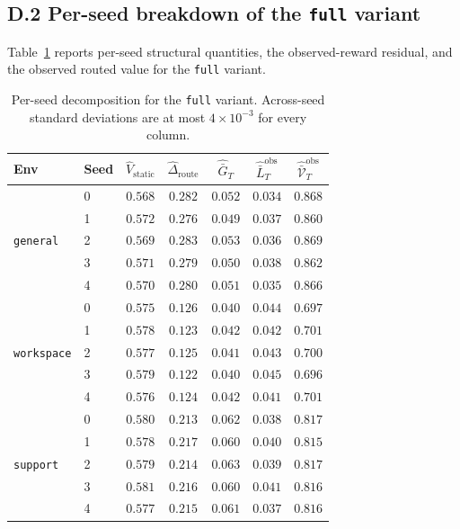 \documentclass{article} %
\begin{document}
\subsection{D.2 Per-seed breakdown of the \texttt{full} variant}

\label{app:tab-perseed}

Table~\ref{tab:app-perseed} reports per-seed structural quantities, the
observed-reward residual, and the observed routed value for the
\texttt{full} variant.

\begin{table}[h]
\centering
\small
\setlength{\tabcolsep}{4pt}
\begin{tabular}{llccccc}
\toprule
Env & Seed & $\widehat V_{\mathrm{static}}$ & $\widehat\Delta_{\mathrm{route}}$ & $\widehat{\bar G}_T$ & $\widehat{\bar L}_T^{\mathrm{obs}}$ & $\widehat{\bar{\mathcal V}}_T^{\mathrm{obs}}$ \\
\midrule
\multirow{5}{*}{\texttt{general}}
 & 0 & $0.568$ & $0.282$ & $0.052$ & $0.034$ & $0.868$ \\
 & 1 & $0.572$ & $0.276$ & $0.049$ & $0.037$ & $0.860$ \\
 & 2 & $0.569$ & $0.283$ & $0.053$ & $0.036$ & $0.869$ \\
 & 3 & $0.571$ & $0.279$ & $0.050$ & $0.038$ & $0.862$ \\
 & 4 & $0.570$ & $0.280$ & $0.051$ & $0.035$ & $0.866$ \\
\midrule
\multirow{5}{*}{\texttt{workspace}}
 & 0 & $0.575$ & $0.126$ & $0.040$ & $0.044$ & $0.697$ \\
 & 1 & $0.578$ & $0.123$ & $0.042$ & $0.042$ & $0.701$ \\
 & 2 & $0.577$ & $0.125$ & $0.041$ & $0.043$ & $0.700$ \\
 & 3 & $0.579$ & $0.122$ & $0.040$ & $0.045$ & $0.696$ \\
 & 4 & $0.576$ & $0.124$ & $0.042$ & $0.041$ & $0.701$ \\
\midrule
\multirow{5}{*}{\texttt{support}}
 & 0 & $0.580$ & $0.213$ & $0.062$ & $0.038$ & $0.817$ \\
 & 1 & $0.578$ & $0.217$ & $0.060$ & $0.040$ & $0.815$ \\
 & 2 & $0.579$ & $0.214$ & $0.063$ & $0.039$ & $0.817$ \\
 & 3 & $0.581$ & $0.216$ & $0.060$ & $0.041$ & $0.816$ \\
 & 4 & $0.577$ & $0.215$ & $0.061$ & $0.037$ & $0.816$ \\
\bottomrule
\end{tabular}
\caption{Per-seed decomposition for the \texttt{full} variant. Across-seed standard deviations are at most $4\times 10^{-3}$ for every column.}
\label{tab:app-perseed}
\end{table}
\end{document}
